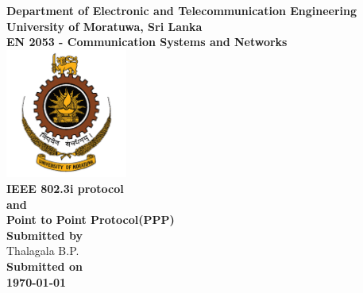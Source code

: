 \begin{titlepage}
\center %

\textbf{\large Department of Electronic and Telecommunication Engineering}\\[0.5cm]
\textbf{\Large University of Moratuwa, Sri Lanka}\\[1cm]
\textbf{\large EN 2053 - Communication Systems and Networks}\\[2cm]
\includegraphics[width=0.3\textwidth]{figures/uomlogo}\\[2cm]

	
\textbf{\Huge IEEE 802.3i protocol \\and \\Point to Point Protocol(PPP)}\\[6cm]



\textbf{\large Submitted by}\\[0.5cm]
{\large Thalagala B.P.} \hspace{1cm}{\large 180631J  }\\[1cm]

\textbf{\large Submitted on}\\[0.5cm]
\textbf{\Large \today} %


\vfill %

\end{titlepage}